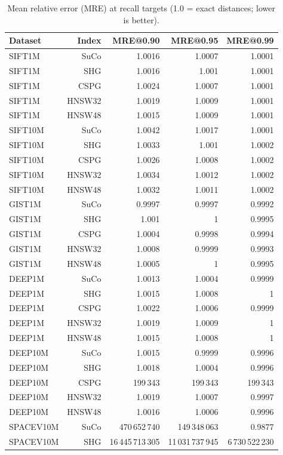 \begin{table}[t]
\centering
\small
\caption{Mean relative error (MRE) at recall targets (1.0 = exact distances; lower is better).}
\label{tab:mre}
\begin{tabular}{lrrrr}
\toprule
Dataset & Index & MRE@0.90 & MRE@0.95 & MRE@0.99 \\
\midrule
SIFT1M & SuCo & 1.0016 & 1.0007 & 1.0001 \\
SIFT1M & SHG & 1.0016 & 1.001 & 1.0001 \\
SIFT1M & CSPG & 1.0024 & 1.0007 & 1.0001 \\
SIFT1M & HNSW32 & 1.0019 & 1.0009 & 1.0001 \\
SIFT1M & HNSW48 & 1.0015 & 1.0009 & 1.0001 \\
SIFT10M & SuCo & 1.0042 & 1.0017 & 1.0001 \\
SIFT10M & SHG & 1.0033 & 1.001 & 1.0002 \\
SIFT10M & CSPG & 1.0026 & 1.0008 & 1.0002 \\
SIFT10M & HNSW32 & 1.0034 & 1.0012 & 1.0002 \\
SIFT10M & HNSW48 & 1.0032 & 1.0011 & 1.0002 \\
GIST1M & SuCo & 0.9997 & 0.9997 & 0.9992 \\
GIST1M & SHG & 1.001 & 1 & 0.9995 \\
GIST1M & CSPG & 1.0004 & 0.9998 & 0.9994 \\
GIST1M & HNSW32 & 1.0008 & 0.9999 & 0.9993 \\
GIST1M & HNSW48 & 1.0005 & 1 & 0.9995 \\
DEEP1M & SuCo & 1.0013 & 1.0004 & 0.9999 \\
DEEP1M & SHG & 1.0015 & 1.0008 & 1 \\
DEEP1M & CSPG & 1.0022 & 1.0006 & 0.9999 \\
DEEP1M & HNSW32 & 1.0019 & 1.0009 & 1 \\
DEEP1M & HNSW48 & 1.0015 & 1.0008 & 1 \\
DEEP10M & SuCo & 1.0015 & 0.9999 & 0.9996 \\
DEEP10M & SHG & 1.0018 & 1.0004 & 0.9996 \\
DEEP10M & CSPG & 199\,343 & 199\,343 & 199\,343 \\
DEEP10M & HNSW32 & 1.0019 & 1.0007 & 0.9997 \\
DEEP10M & HNSW48 & 1.0016 & 1.0006 & 0.9996 \\
SPACEV10M & SuCo & 470\,652\,740 & 149\,348\,063 & 0.9877 \\
SPACEV10M & SHG & 16\,445\,713\,305 & 11\,031\,737\,945 & 6\,730\,522\,230 \\

\end{tabular}
\end{table}
